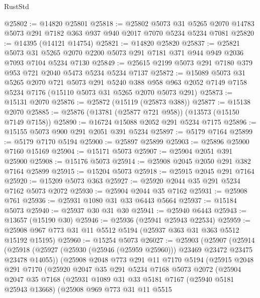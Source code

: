 \begin{lexlean}{RustStd}
\begin{coremodule}
@25802 := @14820 @25801
@25818 := @25802
    @5073
    @31
    @5265
    @2070
    @14783
    @5073
    @291
    @7182
    @363
    @937
    @940
    @2017
    @7070
    @5234
    @5234
    @7081
@25820 := @14395 (@14121 @14754)
@25821 := @14820 @25820
@25837 := @25821
    @5073
    @31
    @5265
    @2070
    @2200
    @5073
    @291
    @7181
    @371
    @944
    @949
    @2036
    @7093
    @7104
    @5234
    @7130
@25849 := @25615 @2199 @5073 @291 @7180 @379 @953 @721 @2040 @5473 @5234 @5234 @7137
@25872 := @15089
    @5073
    @31
    @5265
    @2070
    @721
    @5073
    @291
    @5240
    @388
    @958
    @963
    @2052
    @7149
    @7158
    @5234
    @7176
    (@15110 @5073 @31 @5265 @2070 @5073 @291)
@25873 := @15131 @2070
@25876 := @25872 (@15119 (@25873 @388))
@25877 := @15138 @2070
@25885 := @25876 (@13781 (@25877 @721 @958)) (@13573 (@15150 @7149 @7158))
@25890 := @16724 @15088 @2052 @291 @5234 @7175
@25896 := @15155 @5073 @900 @291 @2051 @391 @5234
@25897 := @5179 @7164
@25899 := @5179 @7170 @5194
@25900 := @25897 @25899
@25903 := @25896 @25900 @7160 @15169
@25904 := @15171 @5073
@25907 := @25904 @2051 @391 @25900
@25908 := @15176 @5073
@25914 := @25908 @2045 @2050 @291 @382 @7164 @25899
@25915 := @15204 @5073
@25918 := @25915 @2045 @291 @7164
@25920 := @15209 @5073 @363
@25927 := @25920 @2044 @35 @291 @5234 @7162 @5073 @2072
@25930 := @25904 @2044 @35 @7162
@25931 := @25908 @761
@25936 := @25931 @1080 @31 @33 @6443 @5664
@25937 := @15184 @5073
@25940 := @25937 @30 @31 @30
@25941 := @25940 @6443
@25943 := @13657 (@15190 @30)
@25946 := @25936 (@25941 @25943 @22534)
@25959 := @25908 @967 @773 @31 @11 @5512 @5194 (@25937 @363 @31 @363 @5512 @15192 @15195)
@25960 := @15254 @5073
@26027 := @25903
    (@25907
      (@25914
        (@25918 (@25927 (@25930 (@25946 (@25959 @25960))) @23469 @23472 @23475 @23478 @14055))
        (@25908
          @2048
          @773
          @291
          @11
          @7170
          @5194
          (@25915
            @2048
            @291
            @7170
            (@25920
              @2047
              @35
              @291
              @5234
              @7168
              @5073
              @2072
              (@25904
                @2047
                @35
                @7168
                (@25931
                  @1089
                  @31
                  @33
                  @5181
                  @7167
                  (@25940 @5181 @25943 @13668)
                  (@25908
                    @969
                    @773
                    @31
                    @11
                    @5515

\end{coremodule}
\end{lexlean}
